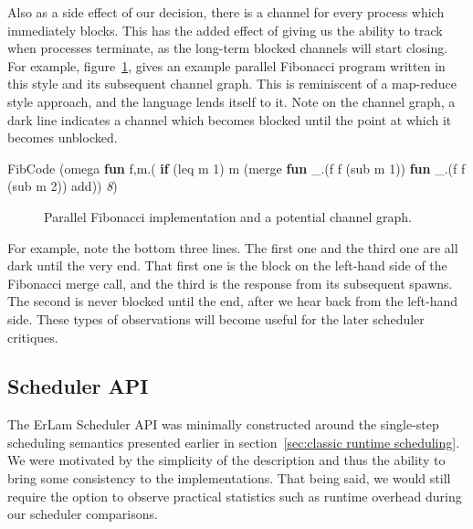 Also as a side effect of our decision, there is a channel for every process which
immediately blocks. This has the added effect of giving us the ability to track when 
processes terminate, as the long-term blocked channels will start closing. For
example, figure~\ref{fig:fibonacci-channel-demo}, gives an example parallel
Fibonacci program written in this style and its subsequent channel graph. This
is reminiscent of a map-reduce style approach, and the language lends itself
to it. Note on the channel graph, a dark line indicates a channel which 
becomes blocked until the point at which it becomes unblocked. 

\begin{SaveVerbatim}[commandchars=\\\{\}]{FibCode}
(omega \textbf{fun} f,m.(
    \textbf{if} (leq m 1) 
       m
       (merge \textbf{fun} _.(f f (sub m 1))
              \textbf{fun} _.(f f (sub m 2))
              add)) \textit{8})
\end{SaveVerbatim}
\begin{figure}[h!]

%
    \caption{Parallel Fibonacci implementation and a potential channel graph.}
    \label{fig:fibonacci-channel-demo}
\end{figure}

For example, note the bottom three lines. The first one and the third one are 
all dark until the very end. That first one is the block on the left-hand side
of the Fibonacci merge call, and the third is the response from its subsequent
spawns. The second is never blocked until the end, after we hear back from the
left-hand side. These types of observations will become useful for the later 
scheduler critiques.

\subsection{Scheduler API}\label{sec:results-evaluation-classical}

The ErLam Scheduler API was minimally constructed around the single-step 
scheduling semantics presented earlier in section~\ref{sec:classic runtime scheduling}.
We were motivated by the simplicity of the description and thus the ability
to bring some consistency to the implementations. That being said, we would still
require the option to observe practical statistics such as runtime overhead 
during our scheduler comparisons. 

